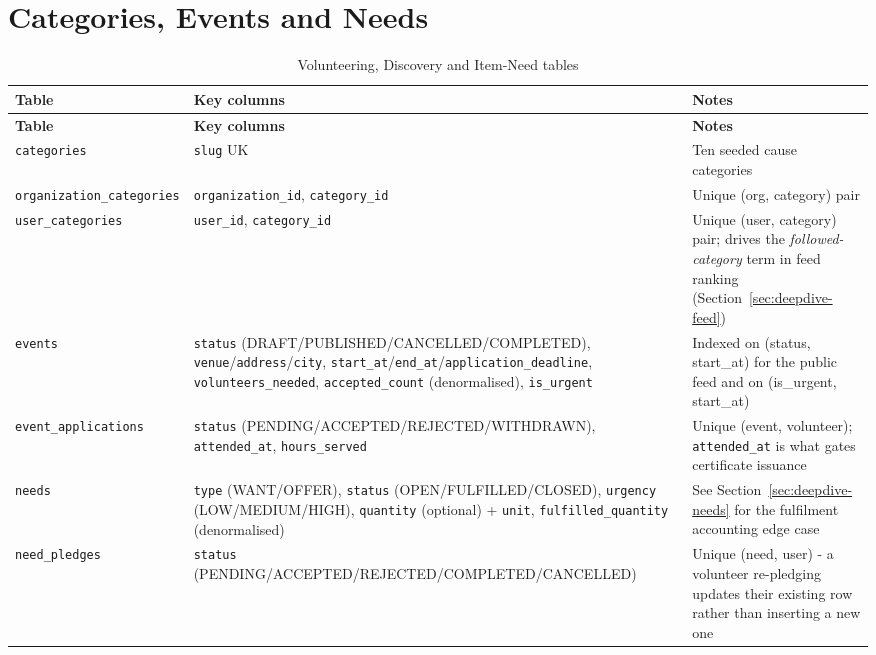 \section{Categories, Events and Needs}
\begin{longtable}{|>{\raggedright\arraybackslash}p{}|>{\raggedright\arraybackslash}p{}|>{\raggedright\arraybackslash}p{}|}
\caption{Volunteering, Discovery and Item-Need tables}\\\hline
\textbf{Table} & \textbf{Key columns} & \textbf{Notes}\\\hline
\endfirsthead\hline\textbf{Table} & \textbf{Key columns} & \textbf{Notes}\\\hline\endhead
\texttt{categories} & \texttt{slug} UK & Ten seeded cause categories\\\hline
\texttt{organization\_\allowbreak categories} & \texttt{organization\_id}, \texttt{category\_id} & Unique (org, category) pair\\\hline
\texttt{user\_\allowbreak categories} & \texttt{user\_id}, \texttt{category\_id} & Unique (user, category) pair; drives the \emph{followed-category} term in feed ranking (Section~\ref{sec:deepdive-feed})\\\hline
\texttt{events} & \texttt{status} (DRAFT/\allowbreak PUBLISHED/\allowbreak CANCELLED/\allowbreak COMPLETED), \texttt{venue}/\allowbreak\texttt{address}/\allowbreak\texttt{city}, \texttt{start\_at}/\allowbreak\texttt{end\_at}/\allowbreak\texttt{application\_deadline}, \texttt{volunteers\_needed}, \texttt{accepted\_count} (denormalised), \texttt{is\_urgent} & Indexed on (status, start\_at) for the public feed and on (is\_urgent, start\_at)\\\hline
\texttt{event\_\allowbreak applications} & \texttt{status} (PENDING/\allowbreak ACCEPTED/\allowbreak REJECTED/\allowbreak WITHDRAWN), \texttt{attended\_at}, \texttt{hours\_served} & Unique (event, volunteer); \texttt{attended\_at} is what gates certificate issuance\\\hline
\texttt{needs} & \texttt{type} (WANT/OFFER), \texttt{status} (OPEN/FULFILLED/CLOSED), \texttt{urgency} (LOW/MEDIUM/HIGH), \texttt{quantity} (optional) + \texttt{unit}, \texttt{fulfilled\_quantity} (denormalised) & See Section~\ref{sec:deepdive-needs} for the fulfilment accounting edge case\\\hline
\texttt{need\_\allowbreak pledges} & \texttt{status} (PENDING/\allowbreak ACCEPTED/\allowbreak REJECTED/\allowbreak COMPLETED/\allowbreak CANCELLED) & Unique (need, user) - a volunteer re-pledging updates their existing row rather than inserting a new one\\\hline
\end{longtable}


